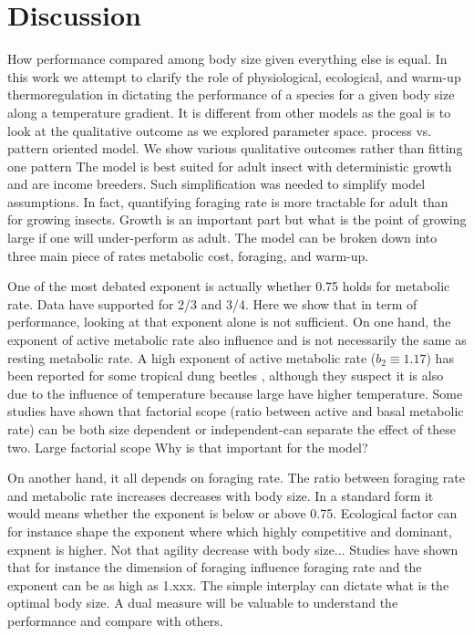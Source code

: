 \section*{Discussion}
How performance compared among body size given everything else is equal.
In this work we attempt to clarify the role of  physiological, ecological, and warm-up thermoregulation in dictating the performance of a species for a given body size along a temperature gradient.
It is different from other models as the goal is to look at the qualitative outcome as we explored parameter space. process vs. pattern oriented model.
We show various qualitative outcomes rather than fitting one pattern
The model is best suited for adult insect with deterministic growth and are income breeders.  
Such simplification was needed to simplify model assumptions.
In fact, quantifying foraging rate is more tractable for adult than for growing insects.
Growth is an important part but what is the point of growing large if one will under-perform as adult.
The model can be broken down into three main piece of rates  metabolic cost, foraging, and warm-up.

One of the most debated exponent is actually whether 0.75 holds for metabolic rate.
Data have supported for 2/3 and 3/4. 
Here we show that in term of performance, looking at that exponent alone is not sufficient.
On one hand, the exponent of active metabolic rate also influence and is not necessarily the same as resting metabolic rate.
A high exponent of active metabolic rate ($b_2 \equiv 1.17$) has been reported for some tropical dung beetles \citep{Bartholomew1978}, although they suspect it is also due to the influence of temperature because large have higher temperature. 
Some studies have shown that factorial scope (ratio between active and basal metabolic rate) can be both size dependent or independent-can separate the effect of these two.
Large factorial scope
Why is that important for the model?
    
On another hand, it all depends on foraging rate.
The ratio between foraging rate and metabolic rate increases decreases with body size.
In a standard form it would means whether the exponent is below or above 0.75.
Ecological factor can for instance shape the exponent where which highly competitive and dominant, expnent is higher.
Not that agility decrease with body size...
Studies have shown that for instance the dimension of foraging influence foraging rate and the exponent can be as high as 1.xxx.
The simple interplay can dictate what is the optimal body size.
A dual measure will be valuable to understand the performance and compare with others.

